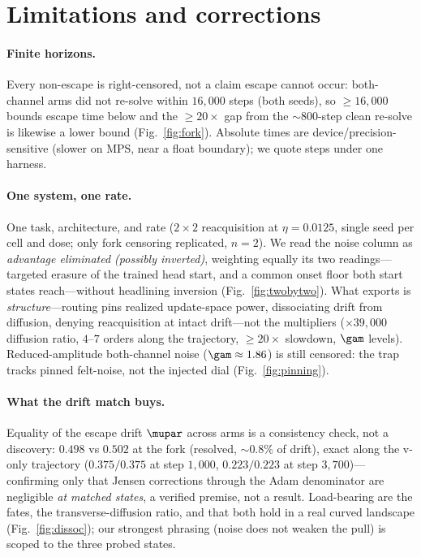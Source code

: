 \section{Limitations and corrections}
\label{sec:limits}

\paragraph{Finite horizons.}
Every non-escape is right-censored, not a claim escape cannot occur: both-channel arms did not re-solve within $16{,}000$ steps (both seeds), so ${\geq}16{,}000$ bounds escape time below and the ${\geq}20\times$ gap from the ${\sim}800$-step clean re-solve is likewise a lower bound (Fig.~\ref{fig:fork}). Absolute times are device/precision-sensitive (slower on MPS, near a float boundary); we quote steps under one harness.

\paragraph{One system, one rate.}
One task, architecture, and rate ($2\times2$ reacquisition at $\eta=0.0125$, single seed per cell and dose; only fork censoring replicated, $n=2$). We read the noise column as \emph{advantage eliminated (possibly inverted)}, weighting equally its two readings---targeted erasure of the trained head start, and a common onset floor both start states reach---without headlining inversion (Fig.~\ref{fig:twobytwo}). What exports is \emph{structure}---routing pins realized update-space power, dissociating drift from diffusion, denying reacquisition at intact drift---not the multipliers ($\times39{,}000$ diffusion ratio, $4$--$7$ orders along the trajectory, ${\geq}20\times$ slowdown, $\gam$ levels). Reduced-amplitude both-channel noise ($\gam\approx1.86$) is still censored: the trap tracks pinned felt-noise, not the injected dial (Fig.~\ref{fig:pinning}).

\paragraph{What the drift match buys.}
Equality of the escape drift $\mupar$ across arms is a consistency check, not a discovery: $0.498$ vs $0.502$ at the fork (resolved, ${\sim}0.8\%$ of drift), exact along the v-only trajectory ($0.375/0.375$ at step $1{,}000$, $0.223/0.223$ at step $3{,}700$)---confirming only that Jensen corrections through the Adam denominator are negligible \emph{at matched states}, a verified premise, not a result. Load-bearing are the fates, the transverse-diffusion ratio, and that both hold in a real curved landscape (Fig.~\ref{fig:dissoc}); our strongest phrasing (noise does not weaken the pull) is scoped to the three probed states.

